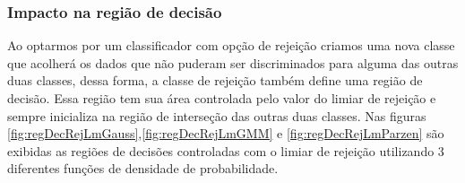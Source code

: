 \documentclass[ 
	article,			%
	11pt,				%
	oneside,			%
	a4paper,			%
	english,			%
	brazil,				%
	]{abntex2}
\begin{document}
\subsubsection{Impacto na região de decisão}
Ao optarmos por um classificador com opção de rejeição criamos uma nova classe
que acolherá os dados que não puderam ser discriminados para alguma das outras
duas classes, dessa forma, a classe de rejeição também define uma região de
decisão. Essa região tem sua área controlada pelo valor do limiar de rejeição e
sempre inicializa na região de interseção das outras duas classes. Nas figuras
\ref{fig:regDecRejLmGauss},\ref{fig:regDecRejLmGMM} e
\ref{fig:regDecRejLmParzen} são exibidas as regiões de decisões controladas com
o limiar de rejeição utilizando 3 diferentes funções de densidade de
probabilidade.

 
\end{document}

